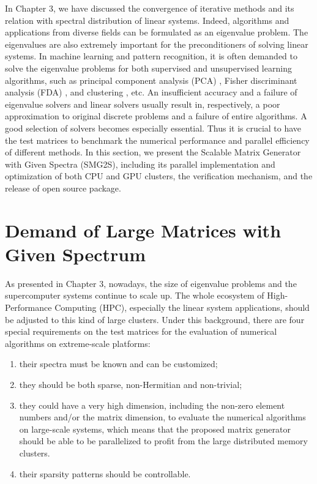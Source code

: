 \begin{displayquote}
	\textsf{In Chapter 3, we have discussed the convergence of iterative methods and its relation with spectral distribution of linear systems. Indeed, algorithms and applications from diverse fields can be formulated as an eigenvalue problem. The eigenvalues are also extremely important for the preconditioners of solving linear systems. In machine learning and pattern recognition, it is often demanded to solve the eigenvalue problems for both supervised and unsupervised learning algorithms, such as principal component analysis (PCA) \cite{croux2000principal}, Fisher discriminant analysis (FDA) \cite{berkes2005handwritten}, and clustering \cite{fender2017parallel}, etc. An insufficient accuracy and a failure of eigenvalue solvers and linear solvers usually result in, respectively, a poor approximation to original discrete problems and a failure of entire algorithms.  A good selection of solvers becomes especially essential. Thus it is crucial to have the test matrices to benchmark the numerical performance and parallel efficiency of different methods. In this section, we present the Scalable Matrix Generator with Given Spectra (SMG2S), including its parallel implementation and optimization of both CPU and GPU clusters, the verification mechanism, and the release of open source package.}
\end{displayquote}

\vspace{0.6in}

\section{Demand of Large Matrices with Given Spectrum}

As presented in Chapter 3, nowadays, the size of eigenvalue problems and the supercomputer systems continue to scale up. The whole ecosystem of High-Performance Computing (HPC), especially the linear system applications, should be adjusted to this kind of large clusters. Under this background, there are four special requirements on the test matrices for the evaluation of numerical algorithms on extreme-scale platforms: 

\begin{enumerate}
	\item their spectra must be known and can be customized;
	\item they should be both sparse, non-Hermitian and non-trivial;
	\item they could have a very high dimension, including the non-zero element numbers and/or the matrix dimension, to evaluate the numerical algorithms on large-scale systems, which means that the proposed matrix generator should be able to be parallelized to profit from the large distributed memory clusters.
	\item their sparsity patterns should be controllable.
\end{enumerate}

